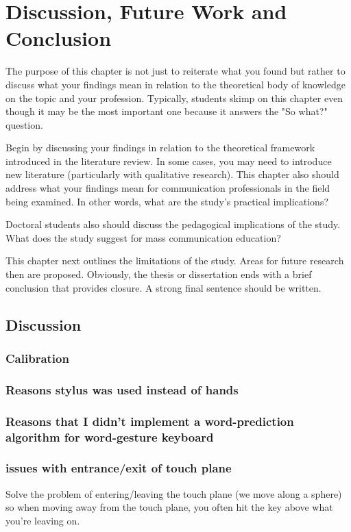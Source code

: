 \chapter{Discussion, Future Work and Conclusion}

The purpose of this chapter is not just to reiterate what you found but rather to discuss what your findings
mean in relation to the theoretical body of knowledge on the topic and your profession. Typically, students skimp
on this chapter even though it may be the most important one because it answers the "So what?" question.

 Begin by discussing your findings in relation to the theoretical framework introduced in the literature
review. In some cases, you may need to introduce new literature (particularly with qualitative research).
 This chapter also should address what your findings mean for communication professionals in the field
being examined. In other words, what are the study's practical implications?

 Doctoral students also should discuss the pedagogical implications of the study. What does the study
suggest for mass communication education?

 This chapter next outlines the limitations of the study. Areas for future research then are proposed.
 Obviously, the thesis or dissertation ends with a brief conclusion that provides closure. A strong final
sentence should be written. 

\section{Discussion}

\subsection{Calibration}

\subsection{Reasons stylus was used instead of hands}

\subsection{Reasons that I didn't implement a word-prediction algorithm for word-gesture keyboard}

\subsection{issues with entrance/exit of touch plane}
Solve the problem of entering/leaving the touch plane (we move along a sphere) so when
	moving away from the touch plane, you often hit the key above what you're leaving on.

